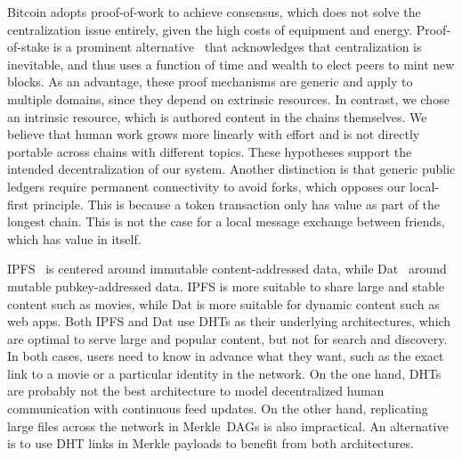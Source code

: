 \documentclass[12pt]{article}
\begin{document}
Bitcoin adopts proof-of-work to achieve consensus, which does not solve the
centralization issue entirely, given the high costs of equipment and energy.
Proof-of-stake is a prominent alternative~\cite{p2p.proofs} that acknowledges
that centralization is inevitable, and thus uses a function of time and wealth
to elect peers to mint new blocks.
As an advantage, these proof mechanisms are generic and apply to multiple
domains, since they depend on extrinsic resources.
In contrast, we chose an intrinsic resource, which is authored content in the
chains themselves.
We believe that human work grows more linearly with effort and is not directly
portable across chains with different topics.
These hypotheses support the intended decentralization of our system.
%
Another distinction is that generic public ledgers require permanent
connectivity to avoid forks, which opposes our local-first principle.
This is because a token transaction only has value as part of the longest
chain.
This is not the case for a local message exchange between friends, which has
value in itself.

IPFS~\cite{p2p.ipfs} is centered around immutable content-addressed data, while
Dat~\cite{p2p.dat} around mutable pubkey-addressed data.
IPFS is more suitable to share large and stable content such as movies, while
Dat is more suitable for dynamic content such as web apps.
%
Both IPFS and Dat use DHTs as their underlying architectures, which are optimal
to serve large and popular content, but not for search and discovery.
In both cases, users need to know in advance what they want, such as the exact
link to a movie or a particular identity in the network.
%
On the one hand, DHTs are probably not the best architecture to model
decentralized human communication with continuous feed updates.
On the other hand, replicating large files across the network in Merkle~DAGs is
also impractical.
An alternative is to use DHT links in Merkle payloads to benefit from both
architectures.
\end{document}
